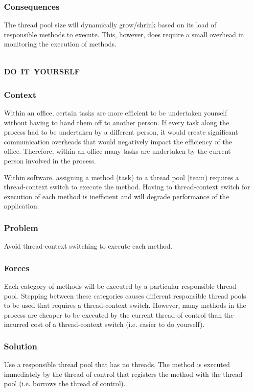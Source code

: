 \documentclass[prodmode]{style/acmlarge}
\begin{document}
\subsubsection*{Consequences} The thread pool size will dynamically grow/shrink
based on its load of responsible methods to execute.  This, however, does
require a small overhead in monitoring the execution of methods.



\subsection{\textsc{\textbf{do it yourself}}}

\subsubsection*{Context} Within an office, certain tasks are more efficient to
be undertaken yourself without having to hand them off to another person.  If
every task along the process had to be undertaken by a different person, it
would create significant communication overheads that would negatively impact
the efficiency of the office.  Therefore, within an office many tasks are
undertaken by the current person involved in the process.

Within software, assigning a method (task) to a thread pool (team) requires a
thread-context switch to execute the method.  Having to thread-context switch
for execution of each method is inefficient and will degrade performance of the
application.

\subsubsection*{Problem} Avoid thread-context switching to execute each method.

\subsubsection*{Forces} Each category of methods will be executed by a
particular responsible thread pool.  Stepping between these categories causes
different responsible thread pools to be used that requires a thread-context
switch.  However, many methods in the process are cheaper to be executed by the
current thread of control than the incurred cost of a thread-context switch
(i.e. easier to do yourself).

\subsubsection*{Solution} Use a responsible thread pool that has no threads.
The method is executed immediately by the thread of control that registers the
method with the thread pool (i.e. borrows the thread of control).
\end{document}
